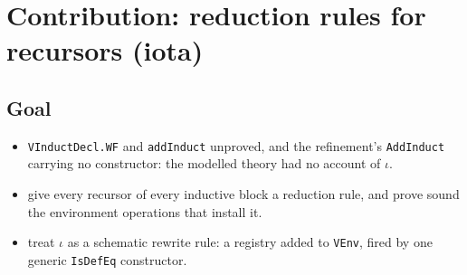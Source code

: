 \chapter{Contribution: reduction rules for recursors (iota)}
\label{chap:contrib-iota}

\section{Goal}
\begin{itemize}
\item {} \texttt{VInductDecl.WF} and \texttt{addInduct} unproved, and the
refinement's \texttt{AddInduct} carrying no constructor: the modelled theory had no account
of $\iota$.
\item {} give every recursor of every inductive block a reduction rule, and prove
sound the environment operations that install it.
\item {} treat $\iota$ as a schematic rewrite rule: a registry added to
\texttt{VEnv}, fired by one generic \texttt{IsDefEq} constructor.
\end{itemize}

